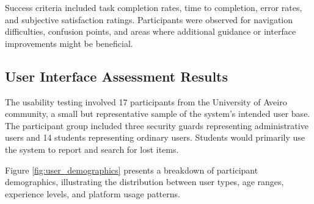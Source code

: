 Success criteria included task completion rates, time to completion, error rates, and subjective satisfaction ratings. Participants were observed for navigation difficulties, confusion points, and areas where additional guidance or interface improvements might be beneficial.

\subsection{User Interface Assessment Results} \label{subsection:ui_assessment}

The usability testing involved 17 participants from the University of Aveiro community, a small but representative sample of the system's intended user base. The participant group included three security guards representing administrative users and 14 students representing ordinary users. Students would primarily use the system to report and search for lost items.

Figure \ref{fig:user_demographics} presents a breakdown of participant demographics, illustrating the distribution between user types, age ranges, experience levels, and platform usage patterns.

